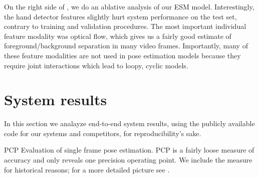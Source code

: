 On the right side of , we do an ablative analysis of our ESM 
model.  Interestingly, the hand detector features slightly hurt system 
performance on the test set, contrary to training and validation procedures.  
The most important individual feature modality was optical flow, which gives us 
a fairly good estimate of foreground/background separation in many video 
frames.  Importantly, many of these feature modalities are not used in pose 
estimation models because they require joint interactions which lead to loopy, 
cyclic models.


\section{System results}
In this section we analayze end-to-end system results, using the publicly 
available code for our systems and competitors, for reproducibility's sake.
\begin{table}[tb]
\begin{center}

\caption[PCP evaluation.]{PCP Evaluation of single frame pose estimation. PCP 
is a fairly loose measure of accuracy and only reveals one precision operating 
point.  We include the measure for historical reasons; for a more detailed 
picture see .}
\label{tab:res-table} 
\end{center}
\end{table}


